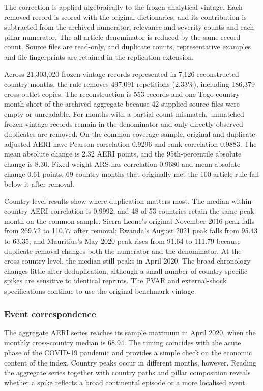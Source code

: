 \documentclass[12pt]{article}
\begin{document}
The correction is applied algebraically to the frozen analytical vintage. Each removed record is scored with the original dictionaries, and its contribution is subtracted from the archived numerator, relevance and severity counts and each pillar numerator. The all-article denominator is reduced by the same record count. Source files are read-only, and duplicate counts, representative examples and file fingerprints are retained in the replication extension.

Across 21,303,020 frozen-vintage records represented in 7,126 reconstructed country-months, the rule removes 497,091 repetitions (2.33\%), including 186,379 cross-outlet copies. The reconstruction is 553 records and one Togo country-month short of the archived aggregate because 42 supplied source files were empty or unreadable. For months with a partial count mismatch, unmatched frozen-vintage records remain in the denominator and only directly observed duplicates are removed. On the common coverage sample, original and duplicate-adjusted AERI have Pearson correlation 0.9296 and rank correlation 0.9883. The mean absolute change is 2.32 AERI points, and the 95th-percentile absolute change is 8.30. Fixed-weight ARS has correlation 0.9680 and mean absolute change 0.61 points. 69 country-months that originally met the 100-article rule fall below it after removal.



Country-level results show where duplication matters most. The median within-country AERI correlation is 0.9992, and 48 of 53 countries retain the same peak month on the common sample. Sierra Leone's original November 2016 peak falls from 269.72 to 110.77 after removal; Rwanda's August 2021 peak falls from 95.43 to 63.35; and Mauritius's May 2020 peak rises from 91.64 to 111.79 because duplicate removal changes both the numerator and the denominator. At the cross-country level, the median still peaks in April 2020. The broad chronology changes little after deduplication, although a small number of country-specific spikes are sensitive to identical reprints. The PVAR and external-shock specifications continue to use the original benchmark vintage.

\subsubsection{Event correspondence}
The aggregate AERI series reaches its sample maximum in April 2020, when the monthly cross-country median is 68.94. The timing coincides with the acute phase of the COVID-19 pandemic and provides a simple check on the economic content of the index. Country peaks occur in different months, however. Reading the aggregate series together with country paths and pillar composition reveals whether a spike reflects a broad continental episode or a more localised event.
\end{document}
